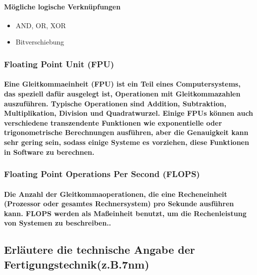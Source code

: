 \documentclass[a4paper]{article}
\begin{document}
    \paragraph{\color{red}Mögliche logische Verknüpfungen}
    \begin{itemize}
        \color{magenta}
        \item AND, OR, XOR
        \item Bitverschiebung
    \end{itemize}

    \subsubsection{\color{codegreen}Floating Point Unit (FPU)}

    \paragraph{\color{codegreen} Eine Gleitkommaeinheit (FPU) ist ein Teil eines Computersystems, das speziell dafür ausgelegt ist, Operationen mit Gleitkommazahlen auszuführen. Typische Operationen sind Addition, Subtraktion, Multiplikation, Division und Quadratwurzel. Einige FPUs können auch verschiedene transzendente Funktionen wie exponentielle oder trigonometrische Berechnungen ausführen, aber die Genauigkeit kann sehr gering sein, sodass einige Systeme es vorziehen, diese Funktionen in Software zu berechnen.}

    \subsubsection{\color{codegreen}Floating Point Operations Per Second (FLOPS)}

    \paragraph{\color{codegreen} Die Anzahl der Gleitkommaoperationen, die eine Recheneinheit (Prozessor oder gesamtes Rechnersystem) pro Sekunde ausführen kann. FLOPS werden als Maßeinheit benutzt, um die Rechenleistung von Systemen zu beschreiben..}

    \subsection{\color{red}Erläutere die technische Angabe der Fertigungstechnik(z.B.7nm)}\label{subsec:erläutere-die-technische-angabe-der-fertigungstechnik(z.b.7nm)}
\end{document}
